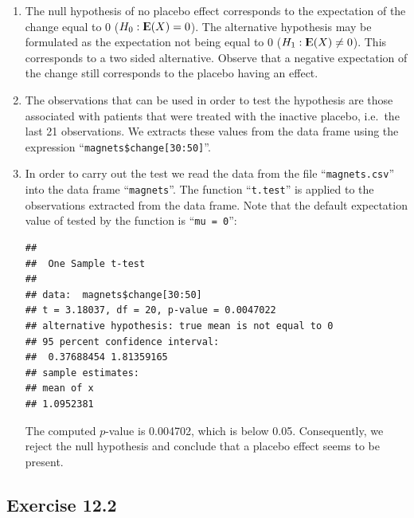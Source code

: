 \documentclass[]{krantz}
\makeatletter
\newenvironment{Shaded}{\begin{snugshade}}{\end{snugshade}}
\newcommand{\DecValTok}[1]{\textcolor[rgb]{0.00,0.00,0.81}{#1}}
\newcommand{\KeywordTok}[1]{\textcolor[rgb]{0.13,0.29,0.53}{\textbf{#1}}}
\newcommand{\NormalTok}[1]{#1}
\newcommand{\OperatorTok}[1]{\textcolor[rgb]{0.81,0.36,0.00}{\textbf{#1}}}
\newcommand{\StringTok}[1]{\textcolor[rgb]{0.31,0.60,0.02}{#1}}
\newcommand{\Expec}{{\rm I\kern-.3em E}}
\newenvironment{kframe}{%
\medskip{}
\setlength{\fboxsep}{.8em}
 \def\at@end@of@kframe{}%
 \ifinner\ifhmode%
  \def\at@end@of@kframe{\end{minipage}}%
  \begin{minipage}{\columnwidth}%
 \fi\fi%
 \def\FrameCommand##1{\hskip\@totalleftmargin \hskip-\fboxsep
 \colorbox{shadecolor}{##1}\hskip-\fboxsep
     \hskip-\linewidth \hskip-\@totalleftmargin \hskip\columnwidth}%
 \MakeFramed {\advance\hsize-\width
   \@totalleftmargin\z@ \linewidth\hsize
   \@setminipage}}%
 {\par\unskip\endMakeFramed%
 \at@end@of@kframe}
\renewenvironment{Shaded}{\begin{kframe}}{\end{kframe}}
\theoremstyle{definition}
\theoremstyle{definition}
\theoremstyle{definition}
\theoremstyle{remark}
\makeatother
\begin{document}
\begin{enumerate}
\def\labelenumi{\arabic{enumi}.}
\item
  The null hypothesis of no placebo
  effect corresponds to the expectation of the change equal to 0
  (\(H_0: \Expec(X) = 0\)). The alternative hypothesis may be formulated as
  the expectation not being equal to 0 (\(H_1: \Expec(X) \not = 0\)). This
  corresponds to a two sided alternative. Observe that a negative
  expectation of the change still corresponds to the placebo having an
  effect.
\item
  The observations that can be used in
  order to test the hypothesis are those associated with patients that
  were treated with the inactive placebo, i.e.~the last 21 observations.
  We extracts these values from the data frame using the expression
  ``\texttt{magnets\$change{[}30:50{]}}''.
\item
  In order to carry out the test we
  read the data from the file ``\texttt{magnets.csv}'' into the data frame
  ``\texttt{magnets}''. The function ``\texttt{t.test}'' is applied to the observations
  extracted from the data frame. Note that the default expectation value
  of tested by the function is ``\texttt{mu\ =\ 0}'':

\begin{Shaded}
\end{Shaded}

\begin{verbatim}
## 
##  One Sample t-test
## 
## data:  magnets$change[30:50]
## t = 3.18037, df = 20, p-value = 0.0047022
## alternative hypothesis: true mean is not equal to 0
## 95 percent confidence interval:
##  0.37688454 1.81359165
## sample estimates:
## mean of x 
## 1.0952381
\end{verbatim}

  The computed \(p\)-value is 0.004702, which is below 0.05. Consequently,
  we reject the null hypothesis and conclude that a placebo effect seems
  to be present.
\end{enumerate}

\hypertarget{exercise-12.2}{%
\subsection*{Exercise 12.2}\label{exercise-12.2}}
\end{document}
